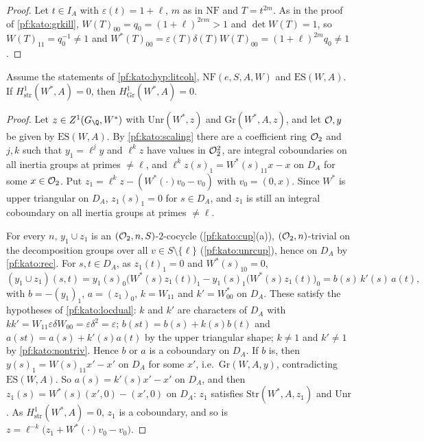 \begin{proof}
Let $t\in I_A$ with $\varepsilon(t)=1+\ell$, $m$ as in $\mathrm{NF}$ and $T=t^{2m}$. As in the proof of \cref{pf:kato:grkill},
$W(T)_{00}=q_0=(1+\ell)^{2em}>1$ and $\det W(T)=1$, so $W(T)_{11}=q_0^{-1}\ne1$ and
$W^*(T)_{00}=\varepsilon(T)\delta(T)W(T)_{00}=(1+\ell)^{2m}q_0\ne1$.
\end{proof}

\begin{theorem}\label{pf:kato:upgrade}
Assume the statements of \cref{pf:kato:hyp:litcoh}, $\mathrm{NF}(e,S,A,W)$ and $\mathrm{ES}(W,A)$. If
$H^1_{\mathrm{str}}(W^*,A)=0$, then $H^1_{\mathrm{Gr}}(W^*,A)=0$.
\end{theorem}

\begin{proof}
Let $z\in\katoZ(G_\Q,W^*)$ with $\mathrm{Unr}(W^*,z)$ and $\mathrm{Gr}(W^*,A,z)$, and let $\mathcal{O},y$ be given by $\mathrm{ES}(W,A)$. By
\cref{pf:kato:scaling} there are a coefficient ring $\mathcal{O}_2$ and $j,k$ such that $y_1=\ell^jy$ and $\ell^kz$ have values in $\mathcal{O}_2^2$,
are integral coboundaries on all inertia groups at primes $\ne\ell$, and $\ell^kz(s)_1=W^*(s)_{11}x-x$ on $D_A$ for some $x\in\mathcal{O}_2$. Put
$z_1=\ell^kz-(W^*(\cdot)v_0-v_0)$ with $v_0=(0,x)$. Since $W^*$ is upper triangular on $D_A$, $z_1(s)_1=0$ for $s\in D_A$, and $z_1$ is
still an integral coboundary on all inertia groups at primes $\ne\ell$.

For every $n$, $y_1\cup z_1$ is an $(\mathcal{O}_2,n,S)$-$2$-cocycle (\cref{pf:kato:cup}(a)), $(\mathcal{O}_2,n)$-trivial on the decomposition groups
over all $v\in S\setminus\{\ell\}$ (\cref{pf:kato:unrcup}), hence on $D_A$ by \cref{pf:kato:rec}. For $s,t\in D_A$, as $z_1(t)_1=0$ and
$W^*(s)_{10}=0$,
\[
  (y_1\cup z_1)(s,t)=y_1(s)_0\bigl(W^*(s)z_1(t)\bigr)_1-y_1(s)_1\bigl(W^*(s)z_1(t)\bigr)_0=b(s)\,k'(s)\,a(t),
\]
with $b=-(y_1)_1$, $a=(z_1)_0$, $k=W_{11}$ and $k'=W^*_{00}$ on $D_A$. These satisfy the hypotheses of \cref{pf:kato:locdual}: $k$ and $k'$
are characters of $D_A$ with $kk'=W_{11}\varepsilon\delta W_{00}=\varepsilon\delta^2=\varepsilon$; $b(st)=b(s)+k(s)b(t)$ and $a(st)=a(s)+k'(s)a(t)$ by
the upper triangular shape; $k\ne1$ and $k'\ne1$ by \cref{pf:kato:nontriv}. Hence $b$ or $a$ is a coboundary on $D_A$. If $b$ is, then
$y(s)_1=W(s)_{11}x'-x'$ on $D_A$ for some $x'$, i.e.\ $\mathrm{Gr}(W,A,y)$, contradicting $\mathrm{ES}(W,A)$. So $a(s)=k'(s)x'-x'$ on $D_A$, and
then $z_1(s)=W^*(s)(x',0)-(x',0)$ on $D_A$: $z_1$ satisfies $\mathrm{Str}(W^*,A,z_1)$ and $\mathrm{Unr}$. As $H^1_{\mathrm{str}}(W^*,A)=0$, $z_1$ is
a coboundary, and so is $z=\ell^{-k}\bigl(z_1+W^*(\cdot)v_0-v_0\bigr)$.
\end{proof}

